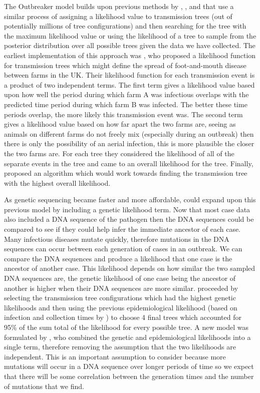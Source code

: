 \documentclass[11pt,a4paper]{report}
\begin{document}
The Outbreaker model builds upon previous methods by \citet{Haydon03}, \citet{Cottam08},\citet{Morelli12} and \citet{Ypma13} that use a similar process of assigning a likelihood value to transmission trees (out of potentially millions of tree configurations) and then searching for the tree with the maximum likelihood value or using the likelihood of a tree to sample from the posterior distribution over all possible trees given the data we have collected. The earliest implementation of this approach was \citet{Haydon03}, who proposed a likelihood function for transmission trees which might define the spread of foot-and-mouth disease between farms in the UK. Their likelihood function for each transmission event is a product of two independent terms. The first term gives a likelihood value based upon how well the period during which farm A was infectious overlaps with the predicted time period during which farm B was infected. The better these time periods overlap, the more likely this transmission event was. The second term gives a likelihood value based on how far apart the two farms are, seeing as animals on different farms do not freely mix (especially during an outbreak) then there is only the possibility of an aerial infection, this is more plausible the closer the two farms are. For each tree they considered the likelihood of all of the separate events in the tree and came to an overall likelihood for the tree. Finally, \citet{Haydon03} proposed an algorithm which would work towards finding the transmission tree with the highest overall likelihood.

As genetic sequencing became faster and more affordable, \citet{Cottam08} could expand upon this previous model by including a genetic likelihood term. Now that most case data also included a DNA sequence of the pathogen then the DNA sequences could be compared to see if they could help infer the immediate ancestor of each case. Many infectious diseases mutate quickly, therefore mutations in the DNA sequences can occur between each generation of cases in an outbreak. We can compare the DNA sequences and produce a likelihood that one case is the ancestor of another case. This likelihood depends on how similar the two sampled DNA sequences are, the genetic likelihood of one case being the ancestor of another is higher when their DNA sequences are more similar. \citet{Cottam08} proceeded by selecting the transmission tree configurations which had the highest genetic likelihoods and then using the previous epidemiological likelihood (based on infection and collection times by \citet{Haydon03}) to choose 4 final trees which accounted for 95\% of the sum total of the likelihood for every possible tree. A new model was formulated by \citet{Ypma13}, who combined the genetic and epidemiological likelihoods into a single term, therefore removing the assumption that the two likelihoods are independent. This is an important assumption to consider because more mutations will occur in a DNA sequence over longer periods of time so we expect that there will be some correlation between the generation times and the number of mutations that we find.
\end{document}
